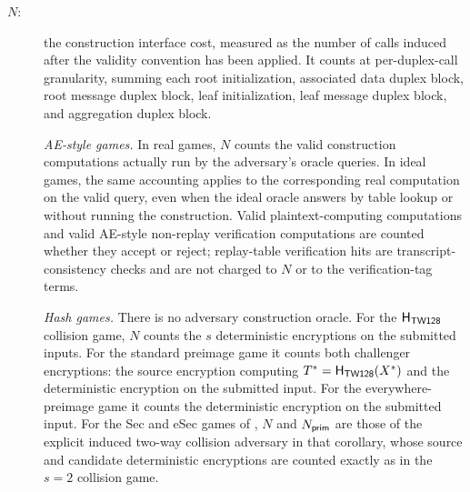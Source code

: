 \begin{description}
\item[$N$:] the construction interface cost, measured as the number of
  \Keccakp{} calls induced after the validity convention has been applied.
  It counts at per-duplex-call granularity, summing each root initialization,
  associated data duplex block, root message duplex block, leaf initialization,
  leaf message duplex block, and aggregation duplex block.

  \emph{AE-style games.} In real games, $N$ counts the valid construction
  computations actually run by the adversary's oracle queries. In ideal games,
  the same accounting applies to the corresponding real \TW{} computation on
  the valid query, even when the ideal oracle answers by table lookup or without
  running the construction. Valid plaintext-computing computations and valid
  AE-style non-replay verification computations are counted whether they accept
  or reject; replay-table verification hits are transcript-consistency checks
  and are not charged to $N$ or to the verification-tag terms.

  \emph{Hash games.} There is no adversary construction oracle. For the $\mathsf{H}_{\mathsf{TW128}}$
  collision game, $N$ counts the $s$ deterministic encryptions on the submitted
  inputs. For the standard preimage game it counts both challenger encryptions:
  the source encryption computing $T^* = \mathsf{H}_{\mathsf{TW128}}(X^*)$ and the deterministic
  encryption on the submitted input. For the everywhere-preimage game it counts
  the deterministic encryption on the submitted input. For the Sec and eSec
  games of , $N$ and $N_{\mathsf{prim}}$ are those of the
  explicit induced two-way collision adversary in that corollary, whose source
  and candidate deterministic encryptions are counted exactly as in the
  $s = 2$ collision game.


\end{description}
